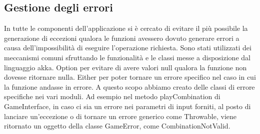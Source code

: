 \subsection[Errori]{Gestione degli errori}
In tutte le componenti dell’applicazione si è cercato di evitare il più possibile la generazione di eccezioni qualora le funzioni avessero dovuto generare errori a causa dell’impossibilità di eseguire l’operazione richiesta.
Sono stati utilizzati dei meccanismi comuni sfruttando le funzionalità e le classi messe a disposizione dal linguaggio akka.
Option per evitare di avere valori null qualora la funzione non dovesse ritornare nulla.
Either per poter tornare un errore specifico nel caso in cui la funzione andasse in errore.
A questo scopo abbiamo creato delle classi di errore specifiche nei vari moduli.
Ad esempio nel metodo playCombination di GameInterface, in caso ci sia un errore nei parametri di input forniti, al posto di lanciare un’eccezione o di tornare un errore generico come Throwable, viene ritornato un oggetto della classe GameError, come CombinationNotValid.
\newpage